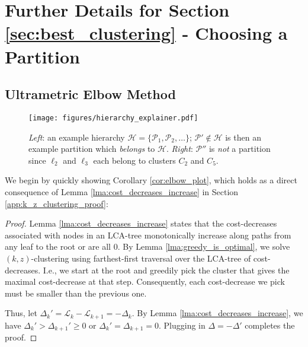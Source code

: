 \section{Further Details for Section \ref{sec:best_clustering} - Choosing a Partition}
\label{app:best_clustering}

\subsection{Ultrametric Elbow Method}
\label{app:ultrametric_elbow}


\begin{figure*}[hbt]
    \centering
    \texttt{[image: figures/hierarchy\_explainer.pdf]}
    \caption{\emph{Left}: an example hierarchy $\mathcal{H} = \{\mathcal{P}_1, \mathcal{P}_2, \ldots \}$; $\mathcal{P}' \not\in \mathcal{H}$ is then an example partition which \emph{belongs} to $\mathcal{H}$. \emph{Right}: $\mathcal{P}''$ is \emph{not} a partition since $\ell_2$ and $\ell_3$ each belong to clusters $C_2$ and $C_5$.}
    \label{fig:elbow_weakness}
\end{figure*}


We begin by quickly showing Corollary \ref{cor:elbow_plot}, which holds as a direct consequence of Lemma \ref{lma:cost_decreases_increase} in Section \ref{app:k_z_clustering_proof}:
\ElbowPlotCor*

\begin{proof}
    Lemma \ref{lma:cost_decreases_increase} states that the cost-decreases associated with nodes in an LCA-tree monotonically increase along paths from any leaf to the root or are all 0. By Lemma \ref{lma:greedy_is_optimal}, we solve $(k, z)$-clustering using farthest-first traversal over the LCA-tree of cost-decreases. I.e., we start at the root and greedily pick the cluster that gives the maximal cost-decrease at that step. Consequently, each cost-decrease we pick must be smaller than the previous one.
    
    Thus, let $\Delta_k' = \mathcal{L}_k - \mathcal{L}_{k+1} = -\Delta_k$. By Lemma \ref{lma:cost_decreases_increase}, we have $\Delta_k' > \Delta_{k+1}' \geq 0$ or $\Delta_k' = \Delta_{k+1} = 0$. Plugging in $\Delta = -\Delta'$ completes the proof.
\end{proof}

